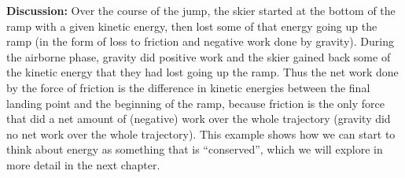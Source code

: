 \begin{framed}
\textbf{Discussion:} Over the course of the jump, the skier started at the bottom of the ramp with a given kinetic energy, then lost some of that energy going up the ramp (in the form of loss to friction and negative work done by gravity). During the airborne phase, gravity did positive work and the skier gained back some of the kinetic energy that they had lost going up the ramp. Thus the net work done by the force of friction is the difference in kinetic energies between the final landing point and the beginning of the ramp, because friction is the only force that did a net amount of (negative) work over the whole trajectory (gravity did no net work over the whole trajectory). This example shows how we can start to think about energy as something that is ``conserved'', which we will explore in more detail in the next chapter.
\end{framed}

